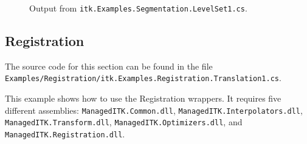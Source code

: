 \documentclass{InsightArticle}
\def\code#1{\texttt{#1}}
\begin{document}
\begin{figure}
{    }
    \hspace{0.25mm}
    \hspace{0.25mm}
    \hspace{0.25mm}
    \hspace{0.25mm}
    \caption{Output from \code{itk.Examples.Segmentation.LevelSet1.cs}.}
	\label{fig:ExamplesSegmentationLevelSet1a}
\end{figure}
\fi


\subsection{Registration}
The source code for this section can be found in the file\\
\code{Examples/Registration/itk.Examples.Registration.Translation1.cs}.

This example shows how to use the Registration wrappers.
It requires five different assemblies:
\code{ManagedITK.Common.dll},
\code{ManagedITK.Interpolators.dll},
\code{ManagedITK.Transform.dll},
\code{ManagedITK.Optimizers.dll}, and
\code{ManagedITK.Registration.dll}.
\end{document}
